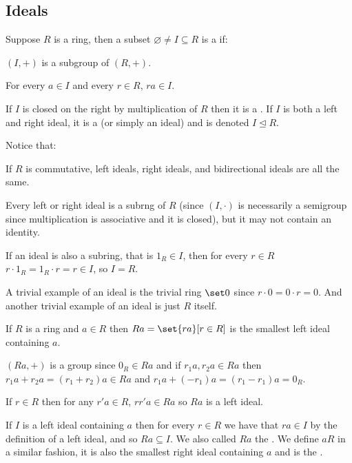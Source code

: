 \documentclass[10pt]{article}
\let\ideal=\trianglelefteq
\begin{document}


\bigskip

\subsection{Ideals}

\begin{defn*}

    Suppose $R$ is a ring, then a subset $\varnothing\neq I\subseteq R$ is a  if:
    \benum
        \item $(I,+)$ is a subgroup of $(R,+)$.
        \item For every $a\in I$ and every $r\in R$, $ra\in I$.
    \eenum

    If $I$ is closed on the right by multiplication of $R$ then it is a .
    If $I$ is both a left and right ideal, it is a  (or simply an ideal) and is denoted $I\ideal R$.

\end{defn*}

Notice that:
\benum
    \item If $R$ is commutative, left ideals, right ideals, and bidirectional ideals are all the same.
    \item Every left or right ideal is a subrng of $R$ (since $(I,\cdot)$ is necessarily a semigroup since multiplication is associative and it is closed), but it may not contain an identity.
    \item If an ideal is also a subring, that is $1_R\in I$, then for every $r\in R$ $r\cdot1_R=1_R\cdot r=r\in I$, so $I=R$.
\eenum

A trivial example of an ideal is the trivial ring $\set0$ since $r\cdot0=0\cdot r=0$.
And another trivial example of an ideal is just $R$ itself.

\begin{exam*}

    If $R$ is a ring and $a\in R$ then $Ra=\set{ra}[r\in R]$ is the smallest left ideal containing $a$.
    \benum
        \item $(Ra,+)$ is a group since $0_R\in Ra$ and if $r_1a,r_2a\in Ra$ then $r_1a+r_2a=(r_1+r_2)a\in Ra$ and $r_1a+(-r_1)a=(r_1-r_1)a=0_R$.
        \item If $r\in R$ then for any $r'a\in R$, $rr'a\in Ra$ so $Ra$ is a left ideal.
        \item If $I$ is a left ideal containing $a$ then for every $r\in R$ we have that $ra\in I$ by the definition of a left ideal, and so $Ra\subseteq I$.
    \eenum
    We also called $Ra$ the .
    We define $aR$ in a similar fashion, it is also the smallest right ideal containing $a$ and is the .

\end{exam*}
\end{document}

